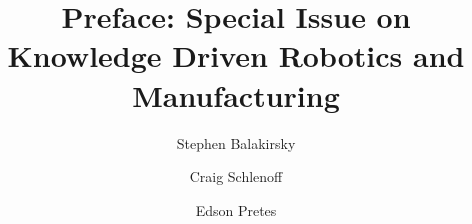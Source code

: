 \documentclass[review]{elsarticle}
\begin{document}
\begin{frontmatter}

\title{Preface: Special Issue on Knowledge Driven Robotics and Manufacturing}

\author{Stephen Balakirsky}
\address{Georgia Tech Research Institute, Atlanta, GA 30332, USA}

\author{Craig Schlenoff}
\address{National Institute of Standards and Technology, Gaithersburg, MD 20899, USA}

\author{Edson Pretes}
\address{Please fill in}

\end{frontmatter}

\linenumbers

%
%
%
%



%
%



%
%
%
%
\end{document}
